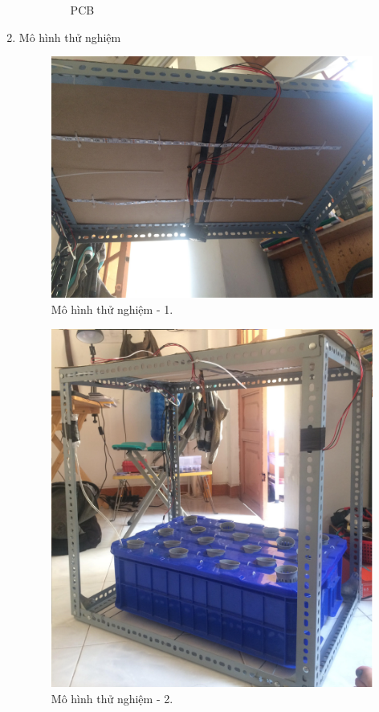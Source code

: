 \documentclass[a4paper,12pt,oneside]{article}
\begin{document}
\begin{enumerate}
\begin{itemize}
\begin{figure}[H]
			\caption{PCB}
			\end{figure}
	\end{itemize}
	\item Mô hình thử nghiệm
			\begin{figure}[H]
			\centering
			\includegraphics[scale=.1]{hinh/mohinh_1.jpg}
			\caption{Mô hình thử nghiệm - 1.}
			\end{figure}
			
			\begin{figure}[H]
			\centering
			\includegraphics[scale=.125]{hinh/mohinh_2.jpg}
			\caption{Mô hình thử nghiệm - 2.}
			\end{figure}
			

\end{enumerate}
\end{document}
